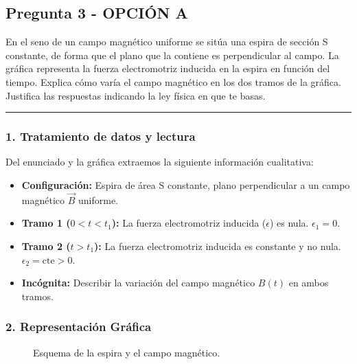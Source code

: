 \newpage
\subsection{Pregunta 3 - OPCIÓN A}
\label{subsec:3A_2025_jul_ext}

\begin{cajaenunciado}
En el seno de un campo magnético uniforme se sitúa una espira de sección S constante, de forma que el plano que la contiene es perpendicular al campo. La gráfica representa la fuerza electromotriz inducida en la espira en función del tiempo. Explica cómo varía el campo magnético en los dos tramos de la gráfica. Justifica las respuestas indicando la ley física en que te basas.
\end{cajaenunciado}
\hrule

\subsubsection*{1. Tratamiento de datos y lectura}
Del enunciado y la gráfica extraemos la siguiente información cualitativa:
\begin{itemize}
    \item \textbf{Configuración:} Espira de área S constante, plano perpendicular a un campo magnético $\vec{B}$ uniforme.
    \item \textbf{Tramo 1 ($0 < t < t_1$):} La fuerza electromotriz inducida ($\epsilon$) es nula. $\epsilon_1 = 0$.
    \item \textbf{Tramo 2 ($t > t_1$):} La fuerza electromotriz inducida es constante y no nula. $\epsilon_2 = \text{cte} > 0$.
    \item \textbf{Incógnita:} Describir la variación del campo magnético $B(t)$ en ambos tramos.
\end{itemize}

\subsubsection*{2. Representación Gráfica}
\begin{figure}[H]
    \centering
    \caption{Esquema de la espira y el campo magnético.}
\end{figure}

